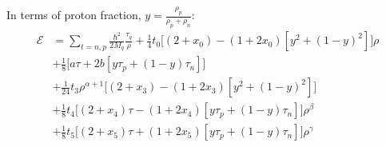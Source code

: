 \documentclass[preprint,prc,preprintnumbers,superscriptaddress,amsmath,amssymb,floatfix]{revtex4-1}
\begin{document}
In terms of proton fraction, $y = \frac{\rho_p}{\rho_p+\rho_n}$:
\begin{equation}
 \begin{split}
  \mathcal{E}&= \sum_{t=n,p}\frac{\hbar^2}{2M_q}\frac{\tau_q}{\rho}+\frac{1}{4}t_0\Big[(2+x_0)-(1+2x_0)[y^2+(1-y)^2]\Big]\rho\\
  &+\frac{1}{8}\Big[ a \tau+2b[y \tau_p + (1-y)\tau_n]\Big]\\
  &+\frac{1}{24}t_3\rho^{\alpha+1}\Big[(2+x_3)-(1+2x_3)[y^2+(1-y)^2]\Big]\\
  &+\frac{1}{8}t_4\Big[ (2+x_4) \tau-(1+2x_4)[y \tau_p + (1-y)\tau_n]\Big]\rho^{\beta}\\
 &+\frac{1}{8}t_5\Big[ (2+x_5) \tau+(1+2x_5)[y \tau_p + (1-y)\tau_n]\Big]\rho^{\gamma}\\
 \label{eq:SkyrmeEDF}
 \end{split}
\end{equation}
\end{document}
